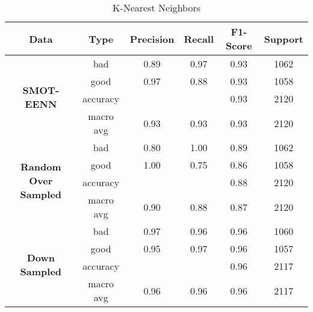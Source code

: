 \documentclass[conference]{IEEEtran}
\begin{document}
    \begin{table}[!t]
        \renewcommand{\arraystretch}{1.25}
        \caption{K-Nearest Neighbors}
        \label{table:knn}
        \centering
        \begin{tabular}{ |c|c|c|c|c|c| }
            \hline
                \textbf{Data} & \textbf{Type} & \textbf{Precision} & \textbf{Recall} & \textbf{F1-Score} & \textbf{Support} \\
            \hline
                \multirow{4}{1.1cm}{\centering \textbf{SMOT-EENN}} & bad & 0.89 & 0.97 & 0.93 & 1062 \\
            \cline{2-6}
                 & good & 0.97 & 0.88 & 0.93 & 1058 \\
            \cline{2-6}
                 & accuracy &  &  & 0.93 & 2120 \\
            \cline{2-6}
                 & macro avg & 0.93 & 0.93 & 0.93 & 2120 \\
            \hline
                \multirow{4}{1.1cm}{\centering \textbf{Random Over Sampled}} & bad & 0.80 & 1.00 & 0.89 & 1062 \\
            \cline{2-6}
                 & good & 1.00 & 0.75 & 0.86 & 1058 \\
            \cline{2-6}
                 & accuracy &  &  & 0.88 & 2120 \\
            \cline{2-6}
                 & macro avg & 0.90 & 0.88 & 0.87 & 2120 \\
            \hline
                \multirow{4}{1.1cm}{\centering \textbf{\textbf{Down Sampled}}} & bad & 0.97 & 0.96 & 0.96 & 1060 \\
            \cline{2-6}
                 & good & 0.95 & 0.97 & 0.96 & 1057 \\
            \cline{2-6}
                 & accuracy &  &  & 0.96 & 2117 \\
            \cline{2-6}
                 & macro avg & 0.96 & 0.96 & 0.96 & 2117 \\
            \hline
        \end{tabular}
    \end{table}
\end{document}
